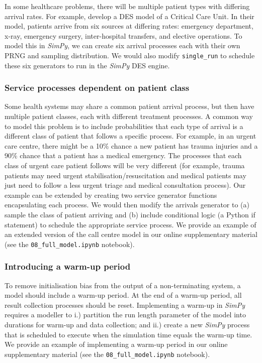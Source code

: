 \documentclass{swpaperproc}
\theoremstyle{sw}
\begin{document}
In some healthcare problems, there will be multiple patient types with differing arrival rates. For example,  develop a DES model of a Critical Care Unit.  In their model, patients arrive from six sources at differing rates: emergency department, x-ray, emergency surgery, inter-hospital transfers, and elective operations. To model this in \textit{SimPy}, we can create six arrival processes each with their own PRNG and sampling distribution.  We would also modify \verb|single_run| to schedule these six generators to run in the \textit{SimPy} DES engine.


\subsubsection{Service processes dependent on patient class}

Some health systems may share a common patient arrival process, but then have multiple patient classes, each with different treatment processes. A common way to model this problem is to include probabilities that each type of arrival is a different class of patient that follows a specific process.  For example, in an urgent care centre, there might be a 10\% chance a new patient has trauma injuries and a 90\% chance that a patient has a medical emergency.  The processes that each class of urgent care patient follows will be very different (for example, trauma patients may need urgent stabilisation/resuscitation and medical patients may just need to follow a less urgent triage and medical consultation process).  Our example can be extended by creating two service generator functions encapsulating each process. We would then modify the arrivals generator to (a) sample the class of patient arriving and (b) include conditional logic (a Python if statement) to schedule the appropriate service process.  We provide an example of an extended version of the call centre model in our online supplementary material (see the \verb|08_full_model.ipynb| notebook).

\subsubsection{Introducing a warm-up period}

To remove initialisation bias from the output of a non-terminating system, a model should include a warm-up period.  At the end of a warm-up period, all result collection processes should be reset.  Implementing a warm-up in \textit{SimPy} requires a modeller to i.) partition the run length parameter of the model into durations for warm-up and data collection; and ii.) create a new \textit{SimPy} process that is scheduled to execute when the simulation time equals the warm-up time.  We provide an example of implementing a warm-up period in our online supplementary material (see the \verb|08_full_model.ipynb| notebook).
\end{document}
